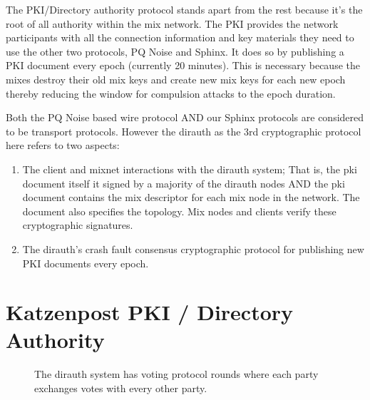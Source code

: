 \documentclass{article}
\begin{document}
The PKI/Directory authority protocol stands apart from the rest because it's the
root of all authority within the mix network. The PKI provides the network participants with all the connection information and key materials they need to use the other two protocols, PQ Noise and Sphinx. It does so by publishing a PKI document every epoch (currently 20 minutes). This is necessary because the mixes destroy their old mix keys and create new mix keys for each new epoch thereby reducing the window for compulsion attacks to the epoch duration.

Both the PQ Noise based wire protocol AND our Sphinx protocols are considered to be transport protocols.
However the dirauth as the 3rd cryptographic protocol here refers to two aspects:

\vspace{.5cm}

\begin{enumerate}
    \item The client and mixnet interactions with the dirauth system; That is, the pki document itself it signed by a majority of the dirauth nodes AND the pki document contains the mix descriptor for each mix node in the network. The document also specifies the topology. Mix nodes and clients verify these cryptographic signatures.
    \item The dirauth's crash fault consensus cryptographic protocol for publishing new PKI documents every epoch.
\end{enumerate}


\pagebreak

\section{Katzenpost PKI / Directory Authority}

\begin{figure}[ht!]
\centering
{}
\caption{The dirauth system has voting protocol rounds where each party exchanges votes with every other party.}
\end{figure}
\end{document}
